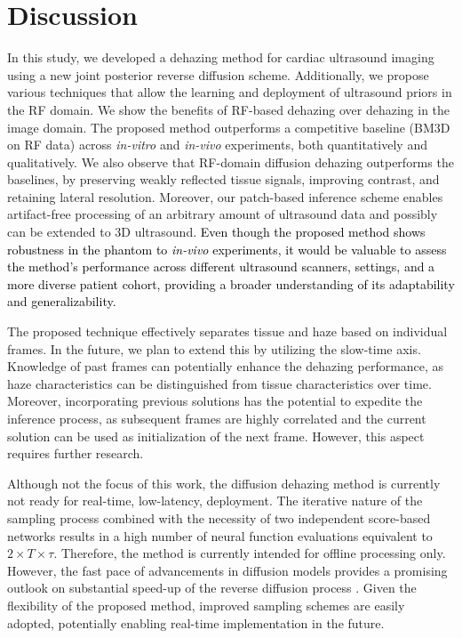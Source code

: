 \documentclass[journal,twoside,web]{ieeecolor}
\newcommand{\TSW}[1]{{\textcolor{black}{#1}}}
\begin{document}
\section{Discussion}
\color{black}
\label{sec:discussion}
In this study, we developed a dehazing method for cardiac ultrasound imaging using a new joint posterior reverse diffusion scheme. Additionally, we propose various techniques that allow the learning and deployment of ultrasound priors in the RF domain. We show the benefits of RF-based dehazing over dehazing in the image domain. The proposed method outperforms a competitive baseline (BM3D on RF data) across \emph{in-vitro} and \emph{in-vivo} experiments, both quantitatively and qualitatively. We also observe that RF-domain diffusion dehazing outperforms the baselines, by preserving weakly reflected tissue signals, improving contrast, and retaining lateral resolution. Moreover, our patch-based inference scheme enables artifact-free processing of an arbitrary amount of ultrasound data and possibly can be extended to 3D ultrasound. \TSW{Even though the proposed method shows robustness in the phantom to \emph{in-vivo} experiments, it would be valuable to assess the method's performance across different ultrasound scanners, settings, and a more diverse patient cohort, providing a broader understanding of its adaptability and generalizability.}

The proposed technique effectively separates tissue and haze based on individual frames. In the future, we plan to extend this by utilizing the slow-time axis. Knowledge of past frames can potentially enhance the dehazing performance, as haze characteristics can be distinguished from tissue characteristics over time. Moreover, incorporating previous solutions has the potential to expedite the inference process, as subsequent frames are highly correlated and the current solution can be used as initialization of the next frame. However, this aspect requires further research.

Although not the focus of this work, the diffusion dehazing method is currently not ready for real-time, low-latency, deployment. The iterative nature of the sampling process combined with the necessity of two independent score-based networks results in a high number of neural function evaluations equivalent to $2\times T \times \tau$. Therefore, the method is currently intended for offline processing only. However, the fast pace of advancements in diffusion models provides a promising outlook on substantial speed-up of the reverse diffusion process \cite{jingSubspaceDiffusionGenerative2022}. Given the flexibility of the proposed method, improved sampling schemes are easily adopted, potentially enabling real-time implementation in the future.
\end{document}
